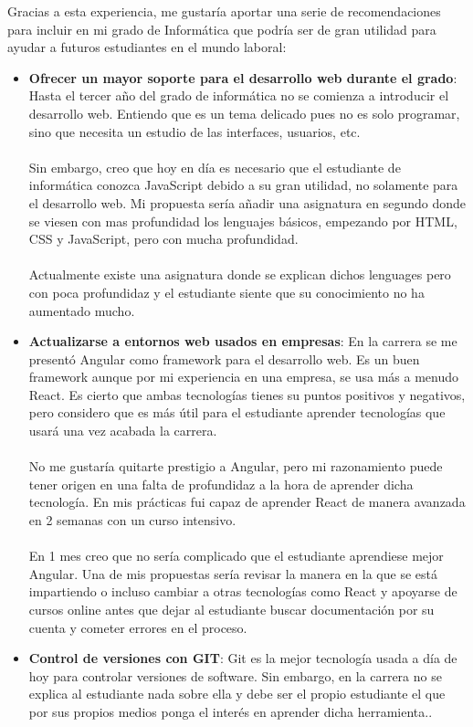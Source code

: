 \documentclass[a4paper,12pt]{article}
\begin{document}
Gracias a esta experiencia, me gustaría aportar una serie de recomendaciones para incluir en mi grado de Informática que podría ser de gran utilidad para ayudar a futuros estudiantes en el mundo laboral: 
\begin{itemize}
\item \textbf{Ofrecer un mayor soporte para el desarrollo web durante el grado}: Hasta el tercer año del grado de informática no se comienza a introducir el desarrollo web. Entiendo que es un tema delicado pues no es solo programar, sino que necesita un estudio de las interfaces, usuarios, etc. \\
\\
Sin embargo, creo que hoy en día es necesario que el estudiante de informática conozca JavaScript debido a su gran utilidad, no solamente para el desarrollo web. Mi propuesta sería añadir una asignatura en segundo donde se viesen con mas profundidad los lenguajes básicos, empezando por HTML, CSS y JavaScript, pero con mucha profundidad. \\
\\Actualmente existe una asignatura donde se explican dichos lenguages pero con poca profundidaz y el estudiante siente que su conocimiento no ha aumentado mucho.
\item \textbf{Actualizarse a entornos web usados en empresas}: En la carrera se me presentó Angular como framework para el desarrollo web. Es un buen framework aunque por mi experiencia en una empresa, se usa más a menudo React. Es cierto que ambas tecnologías tienes su puntos positivos y negativos, pero considero que es más útil para el estudiante aprender tecnologías que usará una vez acabada la carrera.\\
\\
No me gustaría quitarte prestigio a Angular, pero mi razonamiento puede tener origen en una falta de profundidaz a la hora de aprender dicha tecnología. En mis prácticas fui capaz de aprender React de manera avanzada en 2 semanas con un curso intensivo. \\
\\
En 1 mes creo que no sería complicado que el estudiante aprendiese mejor Angular. Una de mis propuestas sería revisar la manera en la que se está impartiendo o incluso cambiar a otras tecnologías como React y apoyarse de cursos online antes que dejar al estudiante buscar documentación por su cuenta y cometer errores en el proceso.
\item \textbf{Control de versiones con GIT}: Git es la mejor tecnología usada a día de hoy para controlar versiones de software. Sin embargo, en la carrera no se explica al estudiante nada sobre ella y debe ser el propio estudiante el que por sus propios medios ponga el interés en aprender dicha herramienta.. \\

\end{itemize}
\end{document}
